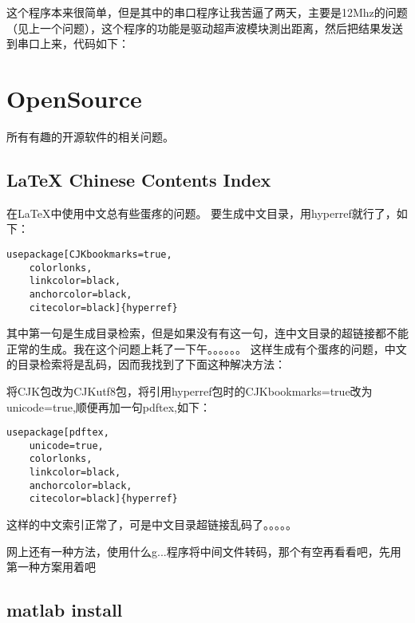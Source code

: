 \documentclass{book}
\begin{document}
\begin{CJK}{UTF8}{gbsn}
这个程序本来很简单，但是其中的串口程序让我苦逼了两天，主要是12Mhz的问题（见上一个问题），这个程序的功能是驱动超声波模块測出距离，然后把结果发送到串口上来，代码如下：


\newpage
\chapter*{OpenSource}
所有有趣的开源软件的相关问题。

\newpage


\section{LaTeX Chinese Contents Index}

在LaTeX中使用中文总有些蛋疼的问题。
要生成中文目录，用hyperref就行了，如下：

\begin{lstlisting}
usepackage[CJKbookmarks=true,
	colorlonks,
	linkcolor=black,
	anchorcolor=black,
	citecolor=black]{hyperref}
\end{lstlisting}

其中第一句是生成目录检索，但是如果没有有这一句，连中文目录的超链接都不能正常的生成。我在这个问题上耗了一下午。。。。。。
这样生成有个蛋疼的问题，中文的目录检索将是乱码，因而我找到了下面这种解决方法：

将CJK包改为CJKutf8包，将引用hyperref包时的CJKbookmarks=true改为unicode=true,顺便再加一句pdftex,如下：

\begin{lstlisting}
usepackage[pdftex,
	unicode=true,
	colorlonks,
	linkcolor=black,
	anchorcolor=black,
	citecolor=black]{hyperref}
\end{lstlisting}

这样的中文索引正常了，可是中文目录超链接乱码了。。。。。

网上还有一种方法，使用什么g...程序将中间文件转码，那个有空再看看吧，先用第一种方案用着吧

\newpage

\section{matlab install}


\end{CJK}
\end{document}
